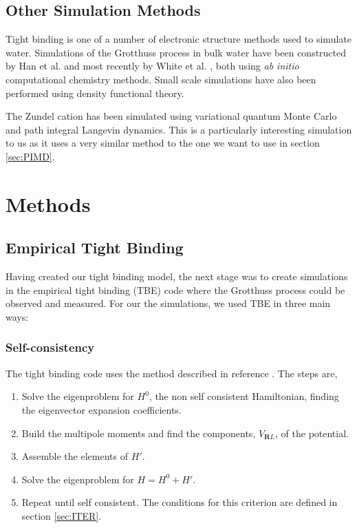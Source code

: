 \documentclass{article}
\begin{document}
\begin{multicols}{2}
\subsection{Other Simulation Methods}

Tight binding is one of a number of electronic structure methods used to simulate water. Simulations of the Grotthuss process in bulk water have been constructed by Han et al. \cite{Han2005} and most recently by White et al. \cite{White2017}, both using \textit{ab initio} computational chemistry methods. Small scale simulations have also been performed \cite{samala2018protonated, chen2018hydroxide} using density functional theory.\cite{Gillan2016}

The Zundel cation has been simulated using variational quantum Monte Carlo and path integral Langevin dynamics.\cite{Mouhat2017} This is a particularly interesting simulation to us as it uses a very similar method to the one we want to use in section \ref{sec:PIMD}.

\section{Methods}
\label{sec:method}

\subsection{Empirical Tight Binding}
Having created our tight binding model, the next stage was to create simulations in the empirical tight binding (TBE) code where the Grotthuss process could be observed and measured. For our the simulations, we used TBE in three main ways:

\subsubsection{Self-consistency}
\label{sec:self-consistent}
The tight binding code uses the method described in reference \cite{Paxton2009}. The steps are,
\begin{enumerate}
	\item Solve the eigenproblem for $H^{0}$, the non self consistent Hamiltonian, finding the eigenvector expansion coefficients.
	\item Build the multipole moments and find the components, $V_{\textbf{R}L}$, of the potential.
	\item Assemble the elements of $H'$.
	\item Solve the eigenproblem for $H=H^{0}+H'$.
	\item Repeat until self consistent. The conditions for this criterion are defined in section \ref{sec:ITER}.
\end{enumerate}


\end{multicols}
\end{document}
